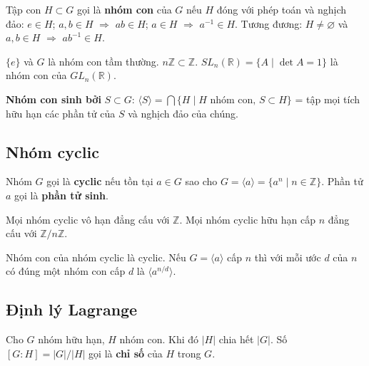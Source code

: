 \documentclass[12pt,a4paper]{article}
\begin{document}
\begin{dinhnghia}
  Tập con $H \subset G$ gọi là \textbf{nhóm con} của $G$ nếu $H$ đóng với phép toán và nghịch đảo: $e \in H$; $a, b \in H$ $\Rightarrow$ $ab \in H$; $a \in H$ $\Rightarrow$ $a^{-1} \in H$. Tương đương: $H \ne \varnothing$ và $a, b \in H$ $\Rightarrow$ $ab^{-1} \in H$.
\end{dinhnghia}

\begin{vidu}
  $\{e\}$ và $G$ là nhóm con tầm thường. $n\mathbb{Z} \subset \mathbb{Z}$. $SL_n(\mathbb{R}) = \{A \mid \det A = 1\}$ là nhóm con của $GL_n(\mathbb{R})$.
\end{vidu}

\begin{dinhnghia}
  \textbf{Nhóm con sinh bởi} $S \subset G$: $\langle S \rangle = \bigcap \{H \mid H \text{ nhóm con, } S \subset H\}$ = tập mọi tích hữu hạn các phần tử của $S$ và nghịch đảo của chúng.
\end{dinhnghia}

\subsection{Nhóm cyclic}

\begin{dinhnghia}
  Nhóm $G$ gọi là \textbf{cyclic} nếu tồn tại $a \in G$ sao cho $G = \langle a \rangle = \{a^n \mid n \in \mathbb{Z}\}$. Phần tử $a$ gọi là \textbf{phần tử sinh}.
\end{dinhnghia}

\begin{dinhly}
  Mọi nhóm cyclic vô hạn đẳng cấu với $\mathbb{Z}$. Mọi nhóm cyclic hữu hạn cấp $n$ đẳng cấu với $\mathbb{Z}/n\mathbb{Z}$.
\end{dinhly}

\begin{dinhly}
  Nhóm con của nhóm cyclic là cyclic. Nếu $G = \langle a \rangle$ cấp $n$ thì với mỗi ước $d$ của $n$ có đúng một nhóm con cấp $d$ là $\langle a^{n/d} \rangle$.
\end{dinhly}

\subsection{Định lý Lagrange}

\begin{dinhly}[title={Định lý Lagrange}]
  Cho $G$ nhóm hữu hạn, $H$ nhóm con. Khi đó $|H|$ chia hết $|G|$. Số $[G:H] = |G|/|H|$ gọi là \textbf{chỉ số} của $H$ trong $G$.
\end{dinhly}
\end{document}
